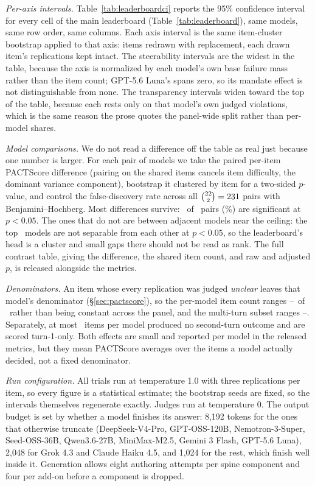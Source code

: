 \emph{Per-axis intervals.} Table~\ref{tab:leaderboardci} reports the 95\% confidence
interval for every cell of the main leaderboard (Table~\ref{tab:leaderboard}), same
models, same row order, same columns. Each axis interval is the same item-cluster
bootstrap applied to that axis: items redrawn with replacement, each drawn item's
replications kept intact. The steerability intervals are the widest in the table,
because the axis is normalized by each model's own base failure mass rather than the
item count; GPT-5.6 Luna's spans zero, so its mandate effect is not distinguishable
from none. The transparency intervals widen toward the top of the table, because each
rests only on that model's own judged violations, which is the same reason the prose
quotes the panel-wide split rather than per-model shares.

\emph{Model comparisons.} We do not read a difference off the table as real just because
one number is larger. For each pair of models we take the paired per-item PACTScore
difference (pairing on the shared items cancels item difficulty, the dominant variance
component), bootstrap it clustered by item for a two-sided $p$-value, and control the
false-discovery rate across all $\binom{22}{2}=231$ pairs with
Benjamini--Hochberg. Most differences survive: \PactNSig\ of \PactNPairs\ pairs
(\PactPctSig\%) are significant at $p<0.05$. The ones that do not are between adjacent
models near the ceiling: the top \PactTopCluster\ models are not separable from each
other at $p<0.05$, so the leaderboard's head is a cluster and small gaps there should
not be read as rank. The full contrast table, giving the difference, the shared item count, and raw
and adjusted $p$, is released alongside the metrics.

\emph{Denominators.} An item whose every replication was judged \emph{unclear} leaves
that model's denominator (\S\ref{sec:pactscore}), so the per-model item count ranges
\PactNDecidedMin--\PactNDecidedMax\ of \PactNItems\ rather than being constant across the
panel, and the multi-turn subset ranges
\PactNDecidedTwoMin--\PactNDecidedTwoMax. Separately, at most \PactNTwoMissing\ items per
model produced no second-turn outcome and are scored turn-1-only. Both effects are small
and reported per model in the released metrics, but they mean PACTScore averages over the
items a model actually decided, not a fixed denominator.

\emph{Run configuration.} All trials run at temperature 1.0 with three replications per
item, so every figure is a statistical estimate; the bootstrap seeds are fixed, so the
intervals themselves regenerate exactly. Judges run at temperature 0. The output budget
is set by whether a model finishes its answer: 8{,}192 tokens for the ones that
otherwise truncate (DeepSeek-V4-Pro, GPT-OSS-120B, Nemotron-3-Super, Seed-OSS-36B,
Qwen3.6-27B, MiniMax-M2.5, Gemini 3 Flash, GPT-5.6 Luna), 2{,}048 for Grok 4.3 and
Claude Haiku 4.5, and 1{,}024 for the rest, which finish well inside it. Generation
allows eight authoring attempts per spine component and four per add-on before a
component is dropped.


